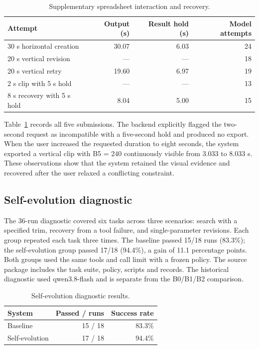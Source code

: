 \begin{table}[htbp]
\centering
\caption{Supplementary spreadsheet interaction and recovery.}
\label{tab:spreadsheet}
\begin{tabular*}{\linewidth}{@{\extracolsep{\fill}}lrrr}
\toprule
Attempt & Output (s) & Result hold (s) & Model attempts \\
\midrule
30 s horizontal creation & 30.07 & 6.03 & 24 \\
20 s vertical revision & --- & --- & 18 \\
20 s vertical retry & 19.60 & 6.97 & 19 \\
2 s clip with 5 s hold & --- & --- & 13 \\
8 s recovery with 5 s hold & 8.04 & 5.00 & 15 \\
\bottomrule
\end{tabular*}
\end{table}

Table~\ref{tab:spreadsheet} records all five submissions. The backend explicitly flagged the two-second request as incompatible with a five-second hold and produced no export. When the user increased the requested duration to eight seconds, the system exported a vertical clip with B5 = 240 continuously visible from 3.033 to 8.033 s. These observations show that the system retained the visual evidence and recovered after the user relaxed a conflicting constraint.


\subsection{Self-evolution diagnostic}
The 36-run diagnostic covered six tasks across three scenarios: search with a specified trim, recovery from a tool failure, and single-parameter revisions. Each group repeated each task three times. The baseline passed 15/18 runs (83.3\%); the self-evolution group passed 17/18 (94.4\%), a gain of 11.1 percentage points. Both groups used the same tools and call limit with a frozen policy. The source package includes the task suite, policy, scripts and records. The historical diagnostic used qwen3.8-flash and is separate from the B0/B1/B2 comparison.

\begin{table}[htbp]
\centering
\renewcommand{\thetable}{3a}
\caption{Self-evolution diagnostic results.}
\label{tab:evolution}
\begin{tabular*}{\linewidth}{@{\extracolsep{\fill}}lrr}
\toprule
System & Passed / runs & Success rate \\
\midrule
Baseline & 15 / 18 & 83.3\% \\
Self-evolution & 17 / 18 & 94.4\% \\
\bottomrule
\end{tabular*}
\end{table}
\addtocounter{table}{-1}

